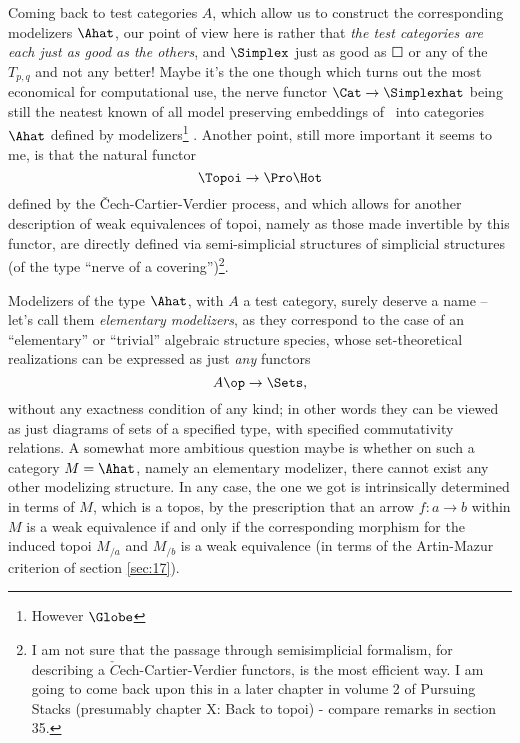 Coming back to test categories $A$, which allow us to construct the
corresponding modelizers $\Ahat$, our point of view here is
rather that \emph{the test categories are each just as good as the others},
and $\Simplex$ just as good as $\Square$ or any of the $T_{p,q}$ and not
any better! Maybe it's the one though which turns out the most
economical for computational use, the nerve functor $\Cat \to
\Simplexhat$ being still the neatest known of all model preserving
embeddings of \Cat\ into categories $\Ahat$ defined by
modelizers\footnote{However $\Globe$}
. Another point, still more important it seems to me, is
that the natural functor
\[\Topoi \to \Pro\Hot\]
defined by the \v Cech-Cartier-Verdier process, and which allows for
another description of weak equivalences of topoi, namely as those
made invertible by this functor, are directly defined via
semi-simplicial structures of simplicial structures (of the type
``nerve of a covering'')\footnote{I am not sure that the passage through semisimplicial formalism, for describing a $\check{C}$ech-Cartier-Verdier functors, is the most efficient way. I am going to come back upon this in a later chapter in volume 2 of Pursuing Stacks (presumably chapter X: Back to topoi) - compare remarks in section 35.}.

Modelizers of the type $\Ahat$, with $A$ a test category, surely
deserve a name -- let's call them \emph{elementary modelizers}, as
they correspond to the case of an ``elementary'' or ``trivial''
algebraic structure species, whose set-theoretical realizations can be
expressed as just \emph{any} functors
\[ A\op \to \Sets, \]
without any exactness condition of any kind; in other words they can
be viewed as just diagrams of sets of a specified type, with specified
commutativity relations. A somewhat more ambitious question maybe is
whether on such a category $M=\Ahat$, namely an elementary
modelizer, there cannot exist any other modelizing structure. In any
case, the one we got is intrinsically determined in terms of $M$,
which is a topos, by the prescription that an arrow $f: a \to b$
within $M$ is a weak equivalence if and only if the corresponding
morphism for the induced topoi $M_{/a}$ and $M_{/b}$ is a weak
equivalence (in terms of the Artin-Mazur criterion of section \ref{sec:17}).

